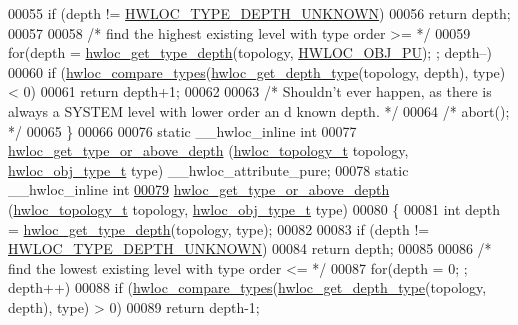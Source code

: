 \begin{DoxyCode}
00055   \textcolor{keywordflow}{if} (depth != \hyperlink{a00046_ggaf4e663cf42bbe20756b849c6293ef575a0565ab92ab72cb0cec91e23003294aad}{HWLOC_TYPE_DEPTH_UNKNOWN})
00056     \textcolor{keywordflow}{return} depth;
00057 
00058   \textcolor{comment}{/* find the highest existing level with type order >= */}
00059   \textcolor{keywordflow}{for}(depth = \hyperlink{a00046_gaea7c64dd59467f5201ba87712710b14d}{hwloc_get_type_depth}(topology, \hyperlink{a00041_ggacd37bb612667dc437d66bfb175a8dc55abca6887e80cb291353b0a0c1da83f661}{HWLOC_OBJ_PU}); ; depth--)
00060     \textcolor{keywordflow}{if} (\hyperlink{a00041_gabd7da4f4ea12b420b8ecbde458b27805}{hwloc_compare_types}(\hyperlink{a00046_gadd4964764ae7e49231065d58a553fd31}{hwloc_get_depth_type}(topology, depth), type) < 0)
00061       \textcolor{keywordflow}{return} depth+1;
00062 
00063   \textcolor{comment}{/* Shouldn't ever happen, as there is always a SYSTEM level with lower order an
      d known depth.  */}
00064   \textcolor{comment}{/* abort(); */}
00065 \}
00066 
00076 \textcolor{keyword}{static} \_\_hwloc\_inline \textcolor{keywordtype}{int}
00077 \hyperlink{a00052_ga62a3f401854c209605c90079700f4bc5}{hwloc_get_type_or_above_depth} (\hyperlink{a00039_ga9d1e76ee15a7dee158b786c30b6a6e38}{hwloc_topology_t} topology, \hyperlink{a00041_gacd37bb612667dc437d66bfb175a8dc55}{hwloc_obj_type_t} type) 
      \_\_hwloc\_attribute\_pure;
00078 \textcolor{keyword}{static} \_\_hwloc\_inline \textcolor{keywordtype}{int}
\hypertarget{a00031_source_l00079}{}\hyperlink{a00052_ga62a3f401854c209605c90079700f4bc5}{00079} \hyperlink{a00052_ga62a3f401854c209605c90079700f4bc5}{hwloc_get_type_or_above_depth} (\hyperlink{a00039_ga9d1e76ee15a7dee158b786c30b6a6e38}{hwloc_topology_t} topology, \hyperlink{a00041_gacd37bb612667dc437d66bfb175a8dc55}{hwloc_obj_type_t} type)
00080 \{
00081   \textcolor{keywordtype}{int} depth = \hyperlink{a00046_gaea7c64dd59467f5201ba87712710b14d}{hwloc_get_type_depth}(topology, type);
00082 
00083   \textcolor{keywordflow}{if} (depth != \hyperlink{a00046_ggaf4e663cf42bbe20756b849c6293ef575a0565ab92ab72cb0cec91e23003294aad}{HWLOC_TYPE_DEPTH_UNKNOWN})
00084     \textcolor{keywordflow}{return} depth;
00085 
00086   \textcolor{comment}{/* find the lowest existing level with type order <= */}
00087   \textcolor{keywordflow}{for}(depth = 0; ; depth++)
00088     \textcolor{keywordflow}{if} (\hyperlink{a00041_gabd7da4f4ea12b420b8ecbde458b27805}{hwloc_compare_types}(\hyperlink{a00046_gadd4964764ae7e49231065d58a553fd31}{hwloc_get_depth_type}(topology, depth), type) > 0)
00089       \textcolor{keywordflow}{return} depth-1;

\end{DoxyCode}
